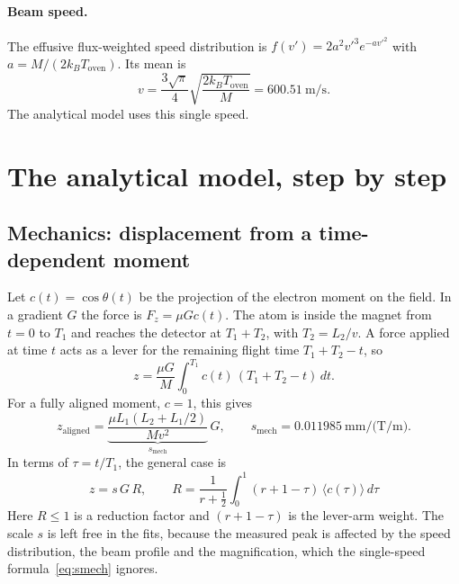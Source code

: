 \documentclass[11pt,a4paper]{article}
\begin{document}
\paragraph{Beam speed.} The effusive flux-weighted speed distribution is $f(v') = 2a^2v'^3e^{-av'^2}$ with $a = M/(2k_BT_\text{oven})$. Its mean is
\begin{equation}
v = \frac{3\sqrt{\pi}}{4}\sqrt{\frac{2k_BT_\text{oven}}{M}} = 600.51\ \text{m/s}.
\label{eq:speed}
\end{equation}
The analytical model uses this single speed.

\section{The analytical model, step by step}

\subsection{Mechanics: displacement from a time-dependent moment}
\label{sec:mech}
Let $c(t)=\cos\theta(t)$ be the projection of the electron moment on the field. In a gradient $G$ the force is $F_z = \mu G c(t)$. The atom is inside the magnet from $t=0$ to $T_1$ and reaches the detector at $T_1+T_2$, with $T_2 = L_2/v$. A force applied at time $t$ acts as a lever for the remaining flight time $T_1+T_2-t$, so
\begin{equation}
z = \frac{\mu G}{M}\int_0^{T_1} c(t)\,(T_1+T_2-t)\,dt .
\label{eq:zint}
\end{equation}
For a fully aligned moment, $c=1$, this gives
\begin{equation}
z_\text{aligned} = \underbrace{\frac{\mu L_1(L_2+L_1/2)}{Mv^2}}_{s_\text{mech}}\,G,
\qquad s_\text{mech} = 0.011985\ \text{mm/(T/m)} .
\label{eq:smech}
\end{equation}
In terms of $\tau=t/T_1$, the general case is
\begin{equation}
\boxed{\;z = s\,G\,R,\qquad R = \frac{1}{r+\frac12}\int_0^1 (r+1-\tau)\,\langle c(\tau)\rangle\,d\tau\;}
\label{eq:Rdef}
\end{equation}
Here $R\le1$ is a reduction factor and $(r+1-\tau)$ is the lever-arm weight. The scale $s$ is left free in the fits, because the measured peak is affected by the speed distribution, the beam profile and the magnification, which the single-speed formula~\eqref{eq:smech} ignores.
\end{document}
